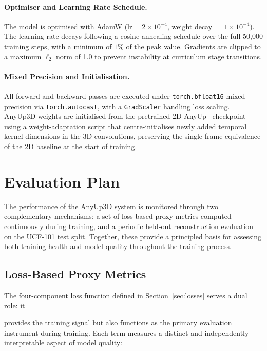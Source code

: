 \paragraph{Optimiser and Learning Rate Schedule.}
The model is optimised with AdamW ($\mathrm{lr} = 2 \times 10^{-4}$, weight decay $= 1 \times 10^{-4}$). The learning rate decays following a cosine annealing schedule over the full 50{,}000 training steps, with a minimum of $1\%$ of the peak value. Gradients are clipped to a maximum $\ell_2$ norm of 1.0 to prevent instability at curriculum stage transitions.

\paragraph{Mixed Precision and Initialisation.}
All forward and backward passes are executed under \texttt{torch.bfloat16} mixed precision via \texttt{torch.autocast}, with a \texttt{GradScaler} handling loss scaling. AnyUp3D weights are initialised from the pretrained 2D AnyUp~\cite{anyup} checkpoint using a weight-adaptation script that centre-initialises newly added temporal kernel dimensions in the 3D convolutions, preserving the single-frame equivalence of the 2D baseline at the start of training.

\section{Evaluation Plan}

The performance of the AnyUp3D system is monitored through two complementary
mechanisms: a set of loss-based proxy metrics computed continuously during training,
and a periodic held-out reconstruction evaluation on the UCF-101 test split.
Together, these provide a principled basis for assessing both training health and
model quality throughout the training process.

\subsection{Loss-Based Proxy Metrics}

The four-component loss function defined in Section~\ref{sec:losses} serves a dual role: it

provides the training signal but also functions as the primary evaluation instrument
during training. Each term measures a distinct and independently interpretable
aspect of model quality:

